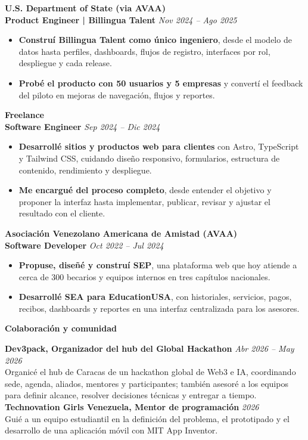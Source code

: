 \documentclass[11pt]{article}
\begin{document}
\vspace{8pt}
\textbf{U.S. Department of State (via AVAA)} \\
\textbf{Product Engineer | Billingua Talent} \hfill \textit{Nov 2024 -- Ago 2025}
\begin{itemize}
    \item \textbf{Construí Billingua Talent como único ingeniero}, desde el modelo de datos hasta perfiles, dashboards, flujos de registro, interfaces por rol, despliegue y cada release.
    \item \textbf{Probé el producto con 50 usuarios y 5 empresas} y convertí el feedback del piloto en mejoras de navegación, flujos y reportes.
\end{itemize}

\textbf{Freelance} \\
\textbf{Software Engineer} \hfill \textit{Sep 2024 -- Dic 2024}
\begin{itemize}
    \item \textbf{Desarrollé sitios y productos web para clientes} con Astro, TypeScript y Tailwind CSS, cuidando diseño responsivo, formularios, estructura de contenido, rendimiento y despliegue.
    \item \textbf{Me encargué del proceso completo}, desde entender el objetivo y proponer la interfaz hasta implementar, publicar, revisar y ajustar el resultado con el cliente.
\end{itemize}

\vspace{8pt}
\textbf{Asociación Venezolano Americana de Amistad (AVAA)} \\
\textbf{Software Developer} \hfill \textit{Oct 2022 -- Jul 2024}
\begin{itemize}
    \item \textbf{Propuse, diseñé y construí SEP}, una plataforma web que hoy atiende a cerca de 300 becarios y equipos internos en tres capítulos nacionales.
    \item \textbf{Desarrollé SEA para EducationUSA}, con historiales, servicios, pagos, recibos, dashboards y reportes en una interfaz centralizada para los asesores.
\end{itemize}

\vspace{8pt}
\begin{center}
    \textbf{Colaboración y comunidad}
\end{center}
\vspace{-4pt}
\textbf{Dev3pack, Organizador del hub del Global Hackathon} \hfill \textit{Abr 2026 -- May 2026} \\
Organicé el hub de Caracas de un hackathon global de Web3 e IA, coordinando sede, agenda, aliados, mentores y participantes; también asesoré a los equipos para definir alcance, resolver decisiones técnicas y entregar a tiempo. \\
\textbf{Technovation Girls Venezuela, Mentor de programación} \hfill \textit{2026} \\
Guié a un equipo estudiantil en la definición del problema, el prototipado y el desarrollo de una aplicación móvil con MIT App Inventor.
\end{document}
